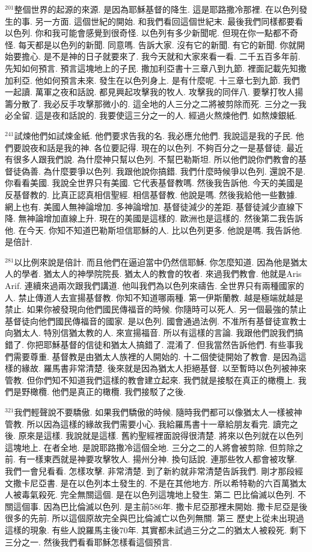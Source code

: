 \documentclass{book}
\begin{document}
$^{201}$整個世界的起源的來源.
是因為耶穌基督的降生.
這是耶路撒冷那裡.
在以色列發生的事.
另一方面.
這個世紀的開始.
和我們看回這個世紀末.
最後我們同樣都要看以色列.
你和我可能會感覺到很奇怪.
以色列有多少新聞呢.
但現在你一點都不奇怪.
每天都是以色列的新聞.
同意嗎.
告訴大家.
沒有它的新聞.
有它的新聞.
你就開始要擔心.
是不是神的日子就要來了.
我今天就和大家來看一看.
二千五百多年前.
先知如何預言.
預言這塊地上的子民.
撒加利亞書十三章八到九節.
裡面記載先知撒加利亞.
他如何預言未來.
發生在以色列身上.
是有什麼呢.
十三章七到九節.
我們一起讀.
萬軍之夜和話說.
都見興起攻擊我的牧人.
攻擊我的同伴八.
要擊打牧人揚籌分散了.
我必反手攻擊那微小的.
這全地的人三分之二將被剪除而死.
三分之一我必全留.
這是夜和話說的.
我要使這三分之一的人.
經過火熬煉他們.
如熬煉銀紙.

$^{241}$試煉他們如試煉金紙.
他們要求告我的名.
我必應允他們.
我說這是我的子民.
他們要說夜和話是我的神.
各位要記得.
現在的以色列.
不夠百分之一是基督徒.
最近有很多人跟我們說.
為什麼神只幫以色列.
不幫巴勒斯坦.
所以他們說你們教會的基督徒偽善.
為什麼要爭以色列.
我跟他說你搞錯.
我們什麼時候爭以色列.
還說不是.
你看看美國.
我說全世界只有美國.
它代表基督教嗎.
然後我告訴他.
今天的美國是反基督教的.
比真正認真相信聖經.
相信基督教.
他說是嗎.
然後我給他一些數據.
網上也有.
美國人無神論增加.
多神論增加.
基督徒減少的差距.
基督徒減少直線下降.
無神論增加直線上升.
現在的美國是這樣的.
歐洲也是這樣的.
然後第二我告訴他.
在今天.
你知不知道巴勒斯坦信耶穌的人.
比以色列更多.
他說是嗎.
我告訴他.
是倍計.

$^{281}$以比例來說是倍計.
而且他們在逼迫當中仍然信耶穌.
你怎麼知道.
因為他是猶太人的學者.
猶太人的神學院院長.
猶太人的教會的牧者.
來過我們教會.
他就是Aris Arif.
連續來過兩次跟我們講道.
他叫我們為以色列來禱告.
全世界只有兩種國家的人.
禁止傳道人去宣揚基督教.
你知不知道哪兩種.
第一伊斯蘭教.
越是極端就越是禁止.
如果你被發現向他們國民傳福音的時候.
你隨時可以死人.
另一個最強的禁止基督徒向他們國民傳福音的國家.
是以色列.
國會通過法例.
不准所有基督徒宣教士向猶太人.
特別信猶太教的人.
來宣揚福音.
所以有這樣的言論.
我跟他們說我們搞錯了.
你把耶穌基督的信徒和猶太人搞錯了.
混淆了.
但我當然告訴他們.
有些事我們需要尊重.
基督教是由猶太人族裡的人開始的.
十二個使徒開始了教會.
是因為這樣的緣故.
羅馬書非常清楚.
後來就是因為猶太人拒絕基督.
以至暫時以色列被神來管教.
但你們知不知道我們這樣的教會建立起來.
我們就是接駁在真正的橄欖上.
我們是野橄欖.
他們是真正的橄欖.
我們接駁了之後.

$^{321}$我們輕聲說不要驕傲.
如果我們驕傲的時候.
隨時我們都可以像猶太人一樣被神管教.
所以因為這樣的緣故我們需要小心.
我給羅馬書十一章給朋友看完.
讀完之後.
原來是這樣.
我說就是這樣.
舊約聖經裡面說得很清楚.
將來以色列就在以色列這塊地上.
在者全地.
是說耶路撒冷這個全地.
三分之二的人將會被剪除.
但剪除之前.
有一樣東西就是神要攻擊牧人.
揚州分神.
換句話說.
連那些牧人都會被攻擊.
我們一會兒看看.
怎樣攻擊.
非常清楚.
到了新約就非常清楚告訴我們.
剛才那段經文撒卡尼亞書.
是在以色列本土發生的.
不是在其他地方.
所以希特勒的六百萬猶太人被毒氣殺死.
完全無關這個.
是在以色列這塊地上發生.
第二 巴比倫滅以色列.
不關這個事.
因為巴比倫滅以色列.
是主前586年.
撒卡尼亞那裡未開始.
撒卡尼亞是後很多的先前.
所以這個原故完全與巴比倫滅亡以色列無關.
第三 歷史上從未出現過這樣的現象.
有些人說羅馬主後70年.
其實都未試過三分之二的猶太人被殺死.
剩下三分之一.
然後我們看看耶穌怎樣看這個預言.
\end{document}
